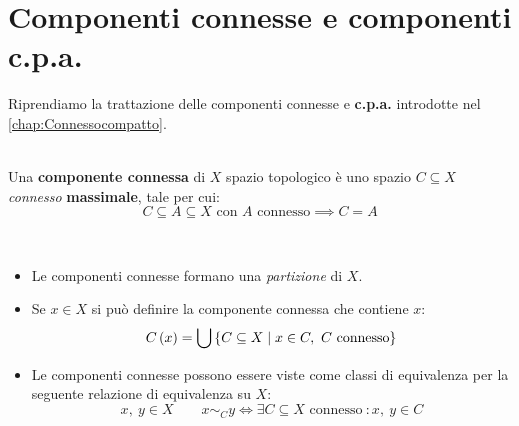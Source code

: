 \section{Componenti connesse e componenti c.p.a.}
Riprendiamo la trattazione delle componenti connesse e \textbf{c.p.a.} introdotte nel \autoref{chap:Connessocompatto}.
\begin{define}~{}\\
	Una \textbf{componente connessa} di $X$ spazio topologico è uno spazio $C\subseteq X$ \textit{connesso} \textbf{massimale}, tale per cui:
	\begin{equation}
		C\subseteq A\subseteq X\text{ con }A\text{ connesso}\implies C=A
	\end{equation}
\vspace{-6mm}
\end{define}
\begin{observes}~{}
\begin{itemize}
	\item Le componenti connesse formano una \textit{partizione} di $X$.
	\item Se $x\in X$ si può definire la componente connessa che contiene $x$:
	\begin{equation}
		C\left(x\right)=\mathop{{\bigcup}}\displaylimits\left\{C\subseteq X\mid x\in C,\ C\text{ connesso}\right\}
	\end{equation}
\item Le componenti connesse possono essere viste come classi di equivalenza per la seguente relazione di equivalenza su $ X $:
	\begin{equation}
		x,\ y\in X\qquad x\sim_C y\iff \exists C\subseteq X\text{ connesso}\ \colon x,\ y\in C
	\end{equation}
\end{itemize}
\vspace{-6mm}
\end{observes}

